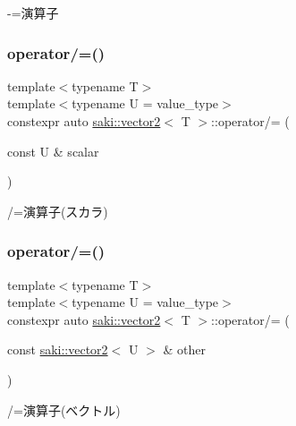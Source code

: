 -\/=演算子 

\mbox{\label{classsaki_1_1vector2_a5ee8bf11db397db036607f461455696c}} 
\subsubsection{\texorpdfstring{operator/=()}{operator/=()}\hspace{0.1cm}{\footnotesize\ttfamily [1/2]}}
{\footnotesize\ttfamily template$<$typename T$>$ \\
template$<$typename U  = value\+\_\+type$>$ \\
constexpr auto \mbox{\hyperlink{classsaki_1_1vector2}{saki\+::vector2}}$<$ T $>$\+::operator/= (\begin{DoxyParamCaption}\item[{const U \&}]{scalar }\end{DoxyParamCaption})\hspace{0.3cm}{\ttfamily [inline]}}



/=演算子(スカラ) 

\mbox{\label{classsaki_1_1vector2_afd078748b33fd375b943a46057ace9ee}} 
\subsubsection{\texorpdfstring{operator/=()}{operator/=()}\hspace{0.1cm}{\footnotesize\ttfamily [2/2]}}
{\footnotesize\ttfamily template$<$typename T$>$ \\
template$<$typename U  = value\+\_\+type$>$ \\
constexpr auto \mbox{\hyperlink{classsaki_1_1vector2}{saki\+::vector2}}$<$ T $>$\+::operator/= (\begin{DoxyParamCaption}\item[{const \mbox{\hyperlink{classsaki_1_1vector2}{saki\+::vector2}}$<$ U $>$ \&}]{other }\end{DoxyParamCaption})\hspace{0.3cm}{\ttfamily [inline]}}



/=演算子(ベクトル) 

